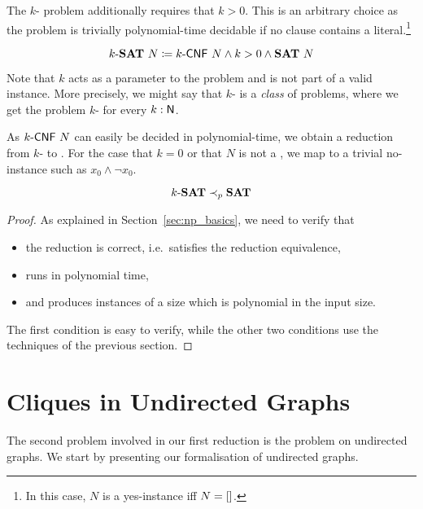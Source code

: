The $k$-\SAT{} problem additionally requires that $k > 0$. This is an arbitrary choice as the problem is trivially polynomial-time decidable if no clause contains a literal.\footnote{In this case, $N$ is a yes-instance iff $N = []$.}
\begin{definition}[$k$-\SAT{}]
  \[\text{$k$-\textbf{SAT}{}}~N \coloneqq \text{$k$-\textsf{CNF}}~N \land k > 0 \land \textbf{SAT}{}~N \]
\end{definition}

Note that $k$ acts as a parameter to the problem and is not part of a valid instance. More precisely, we might say that $k$-\SAT{} is a \emph{class} of problems, where we get the problem $k$-\SAT{} for every $k : \mathsf{N}$. 

As $\text{$k$-\textsf{CNF}}~N$ can easily be decided in polynomial-time, we obtain a reduction from $k$-\SAT{} to \SAT{}. For the case that $k = 0$ or that $N$ is not a , we map to a trivial no-instance such as $x_0 \land \lnot x_0$. 
\begin{lemma}
  \[\text{$k$-\textbf{SAT}{}} \prec_p{} \textbf{SAT}{} \]
\end{lemma}
\begin{proof}
  As explained in Section~\ref{sec:np_basics}, we need to verify that 
  \begin{itemize}
    \item the reduction is correct, i.e.\ satisfies the reduction equivalence, 
    \item runs in polynomial time, 
    \item and produces instances of a size which is polynomial in the input size.
  \end{itemize}
  The first condition is easy to verify, while the other two conditions use the techniques of the previous section.
\end{proof}

\newcommand{\UGraph}{\textsf{UGraph}}
\newcommand{\Edec}{\ensuremath{E_\textsf{dec}}}
\section{Cliques in Undirected Graphs}\label{sec:clique}
The second problem involved in our first reduction is the \Clique{} problem on undirected graphs. We start by presenting our formalisation of undirected graphs.

